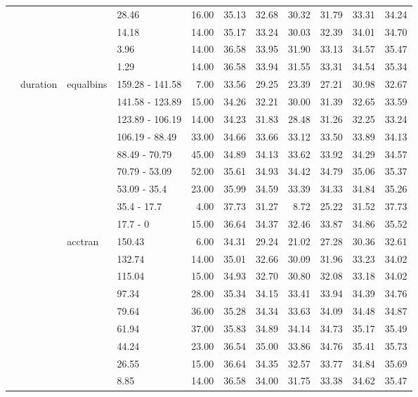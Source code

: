 \begin{longtable}{llllrrrrrrr}
   &  &  & 28.46 & 16.00 & 35.13 & 32.68 & 30.32 & 31.79 & 33.31 & 34.24 \\ 
   &  &  & 14.18 & 14.00 & 35.17 & 33.24 & 30.03 & 32.39 & 34.01 & 34.70 \\ 
   &  &  & 3.96 & 14.00 & 36.58 & 33.95 & 31.90 & 33.13 & 34.57 & 35.47 \\ 
   &  &  & 1.29 & 14.00 & 36.58 & 33.94 & 31.55 & 33.31 & 34.54 & 35.34 \\ 
   & duration & equalbins & 159.28 - 141.58 & 7.00 & 33.56 & 29.25 & 23.39 & 27.21 & 30.98 & 32.67 \\ 
   &  &  & 141.58 - 123.89 & 15.00 & 34.26 & 32.21 & 30.00 & 31.39 & 32.65 & 33.59 \\ 
   &  &  & 123.89 - 106.19 & 14.00 & 34.23 & 31.83 & 28.48 & 31.26 & 32.25 & 33.24 \\ 
   &  &  & 106.19 - 88.49 & 33.00 & 34.66 & 33.66 & 33.12 & 33.50 & 33.89 & 34.13 \\ 
   &  &  & 88.49 - 70.79 & 45.00 & 34.89 & 34.13 & 33.62 & 33.92 & 34.29 & 34.57 \\ 
   &  &  & 70.79 - 53.09 & 52.00 & 35.61 & 34.93 & 34.42 & 34.79 & 35.06 & 35.37 \\ 
   &  &  & 53.09 - 35.4 & 23.00 & 35.99 & 34.59 & 33.39 & 34.33 & 34.84 & 35.26 \\ 
   &  &  & 35.4 - 17.7 & 4.00 & 37.73 & 31.27 & 8.72 & 25.22 & 31.52 & 37.73 \\ 
   &  &  & 17.7 - 0 & 15.00 & 36.64 & 34.37 & 32.46 & 33.87 & 34.86 & 35.52 \\ 
   &  & acctran & 150.43 & 6.00 & 34.31 & 29.24 & 21.02 & 27.28 & 30.36 & 32.61 \\ 
   &  &  & 132.74 & 14.00 & 35.01 & 32.66 & 30.09 & 31.96 & 33.23 & 34.02 \\ 
   &  &  & 115.04 & 15.00 & 34.93 & 32.70 & 30.80 & 32.08 & 33.18 & 34.02 \\ 
   &  &  & 97.34 & 28.00 & 35.34 & 34.15 & 33.41 & 33.94 & 34.39 & 34.76 \\ 
   &  &  & 79.64 & 36.00 & 35.28 & 34.34 & 33.63 & 34.09 & 34.48 & 34.87 \\ 
   &  &  & 61.94 & 37.00 & 35.83 & 34.89 & 34.14 & 34.73 & 35.17 & 35.49 \\ 
   &  &  & 44.24 & 23.00 & 36.54 & 35.00 & 33.86 & 34.76 & 35.41 & 35.73 \\ 
   &  &  & 26.55 & 15.00 & 36.64 & 34.35 & 32.57 & 33.77 & 34.84 & 35.69 \\ 
   &  &  & 8.85 & 14.00 & 36.58 & 34.00 & 31.75 & 33.38 & 34.62 & 35.47 \\ 

\end{longtable}
